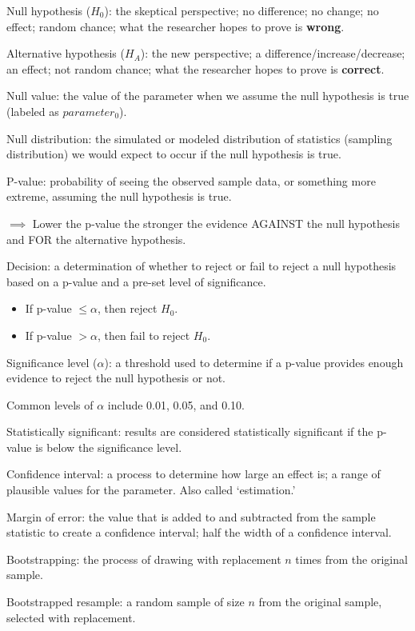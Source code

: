 \documentclass[
]{report}
\newcommand{\rgi}{\hspace{24pt}}  %
\begin{document}
Null hypothesis (\(H_0\)): the skeptical perspective; no difference; no change; no effect; random chance; what the researcher hopes to prove is \textbf{wrong}.

Alternative hypothesis (\(H_A\)): the new perspective; a difference/increase/decrease; an effect; not random chance; what the researcher hopes to prove is \textbf{correct}.

Null value: the value of the parameter when we assume the null hypothesis is true (labeled as \(parameter_0\)).

Null distribution: the simulated or modeled distribution of statistics (sampling distribution) we would expect to occur if the null hypothesis is true.

P-value: probability of seeing the observed sample data, or something more extreme, assuming the null hypothesis is true.

\(\implies\) Lower the p-value the stronger the evidence AGAINST the null hypothesis and FOR the alternative hypothesis.

Decision: a determination of whether to reject or fail to reject a null hypothesis based on a p-value and a pre-set level of significance.

\begin{itemize}
\item
  If p-value \(\leq \alpha\), then reject \(H_0\).
\item
  If p-value \(> \alpha\), then fail to reject \(H_0\).
\end{itemize}

Significance level (\(\alpha\)): a threshold used to determine if a p-value provides enough evidence to reject the null hypothesis or not.

\rgi Common levels of \(\alpha\) include 0.01, 0.05, and 0.10.

Statistically significant: results are considered statistically significant if the p-value is below the significance level.

Confidence interval: a process to determine how large an effect is; a range of plausible values for the parameter. Also called `estimation.'

Margin of error: the value that is added to and subtracted from the sample statistic to create a confidence interval; half the width of a confidence interval.

Bootstrapping: the process of drawing with replacement \(n\) times from the original sample.

Bootstrapped resample: a random sample of size \(n\) from the original sample, selected with replacement.
\end{document}
